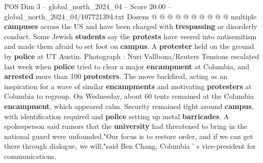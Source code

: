 \begin{textsample}{POS Dim 3 – global\_north\_2024\_04 – Score 20.00 – global\_north\_2024\_04/107721394.txt}
Dozens @ @ @ @ @ @ @ @ @ @ multiple \textbf{campuses} across the US and have been charged with \textbf{trespassing} or disorderly conduct.
Some Jewish \textbf{students} say the \textbf{protests} have veered into antisemitism and made them afraid to set foot on \textbf{campus}.
A \textbf{protester} held on the ground by \textbf{police} at UT Austin.
Photograph : Nuri Vallbona/Reuters Tensions escalated last week when \textbf{police} tried to clear a major \textbf{encampment} at Columbia, and \textbf{arrested} more than 100 \textbf{protesters}.
The move backfired, acting as an inspiration for a wave of similar \textbf{encampments} and motivating \textbf{protesters} at Columbia to regroup.
On Wednesday, about 60 tents remained at the Columbia \textbf{encampment}, which appeared calm.
Security remained tight around \textbf{campus}, with identification required and \textbf{police} setting up metal \textbf{barricades}.
A spokesperson said rumors that the \textbf{university} had threatened to bring in the national guard were unfounded."Our focus is to restore order, and if we can get there through dialogue, we will,"said Ben Chang, Columbia ' s vice-president for communications.

\end{textsample}
